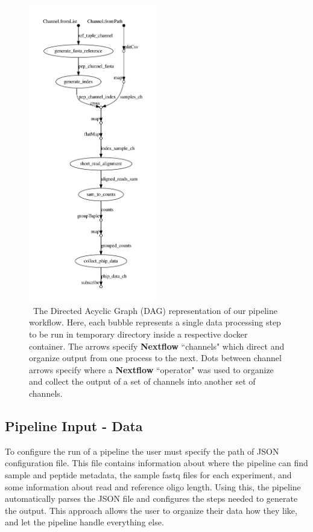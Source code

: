 \documentclass{article}
\begin{document}
\begin{figure}[h!!!!]
\centering
    \includegraphics[width=0.5\textwidth]{figures/dag-1.png}
    \caption { \
The Directed Acyclic Graph (DAG) representation of our pipeline workflow. 
Here, each bubble represents a single data processing step to be run in temporary directory inside a respective docker container. 
The arrows specify \textbf{Nextflow} ``channels" which direct and organize output from one process to the next. 
Dots between channel arrows specify where a \textbf{Nextflow} ``operator" was used to organize and collect the output of a set of channels into another set of channels.
}
\label{fig:DAG}
\end{figure}

\subsection*{Pipeline Input - Data}

To configure the run of a pipeline the user must specify the path of JSON configuration file.
This file contains information about where the pipeline can find sample and peptide metadata, 
the sample fastq files for each experiment, and some information about read and reference oligo length. 
Using this, the pipeline automatically parses the JSON file and configures the steps needed to generate the output.
This approach allows the user to organize their data how they like, and let the pipeline handle everything else.
\end{document}
